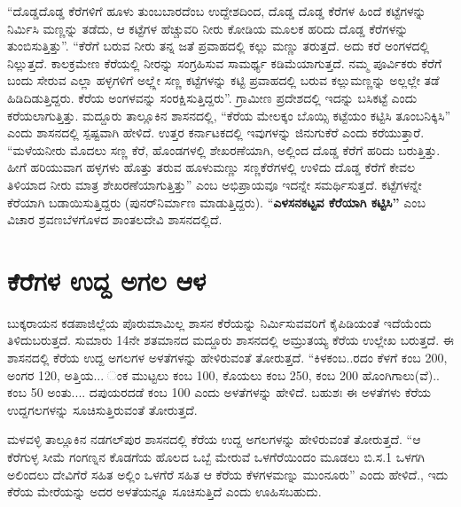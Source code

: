 “ದೊಡ್ಡದೊಡ್ಡ ಕೆರೆಗಳಿಗೆ ಹೂಳು ತುಂಬಬಾರದೆಂಬ ಉದ್ದೇಶದಿಂದ, ದೊಡ್ಡ ದೊಡ್ಡ ಕೆರೆಗಳ ಹಿಂದೆ ಕಟ್ಟೆಗಳನ್ನು ನಿರ್ಮಿಸಿ ಮಣ್ಣನ್ನು ತಡೆದು, ಆ ಕಟ್ಟೆಗಳ ಹೆಚ್ಚುವರಿ ನೀರು ಕೋಡಿಯ ಮೂಲಕ ಹರಿದು ದೊಡ್ಡ ಕೆರೆಗಳನ್ನು ತುಂಬಿಸುತ್ತಿತ್ತು”. “ಕೆರೆಗೆ ಬರುವ ನೀರು ತನ್ನ ಜತೆ ಪ್ರವಾಹದಲ್ಲಿ ಕಲ್ಲು ಮಣ್ಣು ತರುತ್ತದೆ. ಅದು ಕರೆ ಅಂಗಳದಲ್ಲಿ ನಿಲ್ಲುತ್ತದೆ. ಕಾಲಕ್ರಮೇಣ ಕೆರೆಯಲ್ಲಿ ನೀರನ್ನು ಸಂಗ್ರಹಿಸುವ ಸಾಮರ್ಥ್ಯ ಕಡಿಮೆಯಾಗುತ್ತದೆ. ನಮ್ಮ ಪೂರ್ವಿಕರು ಕೆರೆಗೆ ಬಂದು ಸೇರುವ ಎಲ್ಲಾ ಹಳ್ಳಗಳಿಗೆ ಅಲ್ಲ್ಲೇ ಸಣ್ಣ ಕಟ್ಟೆಗಳನ್ನು ಕಟ್ಟಿ ಪ್ರವಾಹದಲ್ಲಿ ಬರುವ ಕಲ್ಲುಮಣ್ಣನ್ನು ಅಲ್ಲಲ್ಲೇ ತಡೆ ಹಿಡಿದಿಡುತ್ತಿದ್ದರು. ಕೆರೆಯ ಅಂಗಳವನ್ನು ಸಂರಕ್ಷಿಸುತ್ತಿದ್ದರು”. ಗ್ರಾಮೀಣ ಪ್ರದೇಶದಲ್ಲಿ ಇದನ್ನು ಬಸಿಕಟ್ಟೆ ಎಂದು ಕರೆಯಲಾಗುತ್ತಿತ್ತು. ಮದ್ದೂರು ತಾಲ್ಲೂಕಿನ ಶಾಸನದಲ್ಲಿ, “ಕೆರೆಯ ಮೇಲಕ್ಕಂ ಬೊಯ್ಸಿ ಕಟ್ಟೆಯಂ ಕಟ್ಟಿಸಿ ತೂಂಬನಿಕ್ಕಿಸಿ” ಎಂದು ಶಾಸನದಲ್ಲಿ ಸ್ಪಷ್ಟವಾಗಿ ಹೇಳಿದೆ. ಉತ್ತರ ಕರ್ನಾಟಕದಲ್ಲಿ ಇವುಗಳನ್ನು ಜಿನುಗುಕೆರೆ ಎಂದು ಕರೆಯುತ್ತಾರೆ. “ಮಳೆಯನೀರು ಮೊದಲು ಸಣ್ಣ ಕೆರೆ, ಹೊಂಡಗಳಲ್ಲಿ ಶೇಖರಣೆಯಾಗಿ, ಅಲ್ಲಿಂದ ದೊಡ್ಡ ಕೆರೆಗೆ ಹರಿದು ಬರುತ್ತಿತ್ತು. ಹೀಗೆ ಹರಿಯುವಾಗ ಹಳ್ಳಗಳು ಹೊತ್ತು ತರುವ ಹೂಳುಮಣ್ಣು ಸಣ್ಣಕೆರೆಗಳಲ್ಲಿ ಉಳಿದು ದೊಡ್ಡ ಕೆರೆಗೆ ಕೇವಲ ತಿಳಿಯಾದ ನೀರು ಮಾತ್ರ ಶೇಖರಣೆಯಾಗುತ್ತಿತ್ತು” ಎಂಬ ಅಭಿಪ್ರಾಯವೂ ಇದನ್ನೇ ಸಮರ್ಥಿಸುತ್ತದೆ. ಕಟ್ಟೆಗಳನ್ನೇ ಕೆರೆಯಾಗಿ ಬಡಾಯಿಸುತ್ತಿದ್ದರು (ಪುನರ್​ನಿರ್ಮಾಣ ಮಾಡುತ್ತಿದ್ದರು). “\textbf{ಎಳಸನಕಟ್ಟವ ಕೆರೆಯಾಗಿ ಕಟ್ಟಿಸಿ”} ಎಂಬ ವಿಚಾರ ಶ್ರವಣಬೆಳಗೊಳದ ಶಾಂತಲದೇವಿ ಶಾಸನದಲ್ಲಿದೆ.


\section{ಕೆರೆಗಳ ಉದ್ದ ಅಗಲ ಆಳ}

ಬುಕ್ಕರಾಯನ ಕಡಪಾಜಿಲ್ಲೆಯ ಪೊರುಮಾಮಿಲ್ಲ ಶಾಸನ ಕೆರೆಯನ್ನು ನಿರ್ಮಿಸುವವರಿಗೆ ಕೈಪಿಡಿಯಂತೆ ಇದೆಯೆಂದು ತಿಳಿದು\-ಬರುತ್ತದೆ. ಸುಮಾರು 14ನೇ ಶತಮಾನದ ಮದ್ದೂರು ಶಾಸನದಲ್ಲಿ ಅಮ್ರುತಯ್ಯ ಕೆರೆಯ ಉಲ್ಲೇಖ ಬರುತ್ತದೆ. ಈ ಶಾಸನದಲ್ಲಿ ಕೆರೆಯ ಉದ್ದ ಅಗಲಗಳ ಅಳತೆಗಳನ್ನು ಹೇಳಿರುವಂತೆ ತೋರುತ್ತದೆ. “ಕಿಳಕಂಬ..ರದಂ ಕೆಳಗೆ ಕಂಬ 200, ಅಂಗರ 120, ಅತ್ತಿಯ... ಂಕ ಮುಟ್ಟಲು ಕಂಬ 100, ಕೊಯಲು ಕಂಬ 250, ಕಂಬ 200 ಹೊಂಗಿಗಾಲು(ವೆ).. ಕಂಬ 50 ಅಂತು.... ದಪುಯರದಡೆ ಕಂಬ 100 ಎಂದು ಅಳತೆಗಳನ್ನು ಹೇಳಿದೆ. ಬಹುಶಃ ಈ ಅಳತೆಗಳು ಕೆರೆಯ ಉದ್ದಗಲಗಳನ್ನು ಸೂಚಿಸುತ್ತಿರುವಂತೆ ತೋರುತ್ತದೆ.

ಮಳವಳ್ಳಿ ತಾಲ್ಲೂಕಿನ ನಡಗಲ್​ಪುರ ಶಾಸನದಲ್ಲಿ ಕೆರೆಯ ಉದ್ದ ಅಗಲಗಳನ್ನು ಹೇಳಿರುವಂತೆ ತೋರುತ್ತದೆ. “ಆ ಕೆರೆಗುಳ್ಳ ಸೀಮೆ ಗಂಗಣ್ನನ ಕೊಡಗೆಯ ಹೊಲದ ಒಬ್ಬೆ ಮೇರುವೆ ಒಳಗೆರೆಯಿಂದಂ ಮೂಡಲು ಬಿ.ಸ.1 ಒಳಗಗಿ ಅಲಿಂದಲು ದೇವಿಗೆರೆ ಸಹಿತ ಅಲ್ಲಿಂ ಒಳಗೆರೆ ಸಹಿತ ಆ ಕೆರೆಯ ಕೆಳಗಳಮಣ್ನು ಮುಂನೂರು” ಎಂದು ಹೇಳಿದೆ., ಇದು ಕೆರೆಯ ಮೇರೆಯನ್ನು ಅದರ ಅಳತೆಯನ್ನೂ ಸೂಚಿಸುತ್ತಿದೆ ಎಂದು ಊಹಿಸಬಹುದು.



